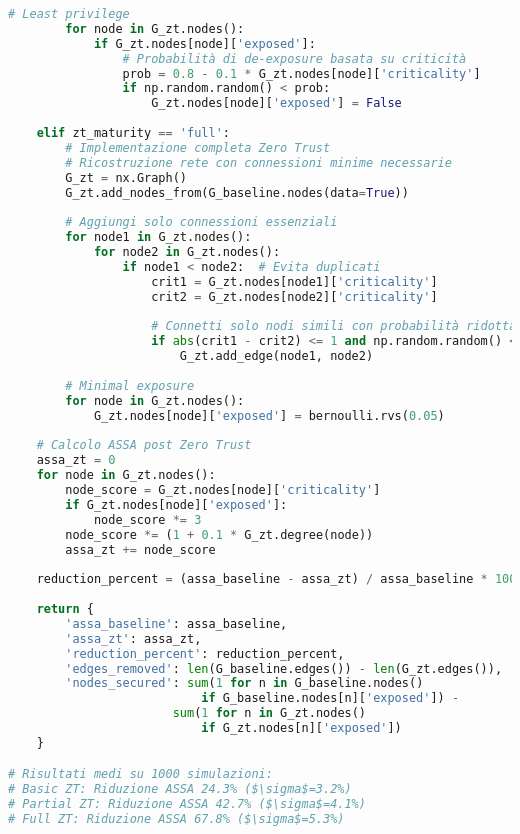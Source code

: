 \begin{lstlisting}[language=Python, caption=Calcolo Riduzione Superficie di Attacco]
        # Least privilege
        for node in G_zt.nodes():
            if G_zt.nodes[node]['exposed']:
                # Probabilità di de-exposure basata su criticità
                prob = 0.8 - 0.1 * G_zt.nodes[node]['criticality']
                if np.random.random() < prob:
                    G_zt.nodes[node]['exposed'] = False
    
    elif zt_maturity == 'full':
        # Implementazione completa Zero Trust
        # Ricostruzione rete con connessioni minime necessarie
        G_zt = nx.Graph()
        G_zt.add_nodes_from(G_baseline.nodes(data=True))
        
        # Aggiungi solo connessioni essenziali
        for node1 in G_zt.nodes():
            for node2 in G_zt.nodes():
                if node1 < node2:  # Evita duplicati
                    crit1 = G_zt.nodes[node1]['criticality']
                    crit2 = G_zt.nodes[node2]['criticality']
                    
                    # Connetti solo nodi simili con probabilità ridotta
                    if abs(crit1 - crit2) <= 1 and np.random.random() < 0.05:
                        G_zt.add_edge(node1, node2)
        
        # Minimal exposure
        for node in G_zt.nodes():
            G_zt.nodes[node]['exposed'] = bernoulli.rvs(0.05)
    
    # Calcolo ASSA post Zero Trust
    assa_zt = 0
    for node in G_zt.nodes():
        node_score = G_zt.nodes[node]['criticality']
        if G_zt.nodes[node]['exposed']:
            node_score *= 3
        node_score *= (1 + 0.1 * G_zt.degree(node))
        assa_zt += node_score
    
    reduction_percent = (assa_baseline - assa_zt) / assa_baseline * 100
    
    return {
        'assa_baseline': assa_baseline,
        'assa_zt': assa_zt,
        'reduction_percent': reduction_percent,
        'edges_removed': len(G_baseline.edges()) - len(G_zt.edges()),
        'nodes_secured': sum(1 for n in G_baseline.nodes() 
                           if G_baseline.nodes[n]['exposed']) - 
                       sum(1 for n in G_zt.nodes() 
                           if G_zt.nodes[n]['exposed'])
    }

# Risultati medi su 1000 simulazioni:
# Basic ZT: Riduzione ASSA 24.3% ($\sigma$=3.2%)
# Partial ZT: Riduzione ASSA 42.7% ($\sigma$=4.1%)
# Full ZT: Riduzione ASSA 67.8% ($\sigma$=5.3%)
\end{lstlisting}

